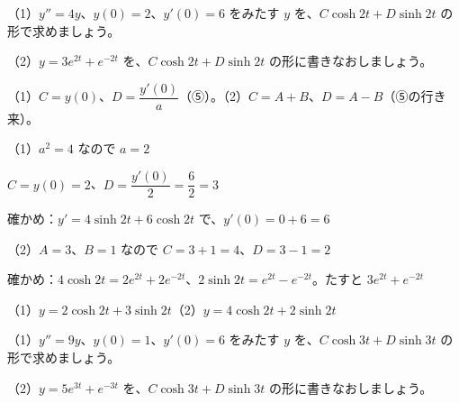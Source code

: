 \begin{reidai}[$y''=a^2y$ を $\cosh$・$\sinh$ で解く]
（1）$y''=4y$、$y(0)=2$、$y'(0)=6$ をみたす $y$ を、$C\cosh2t+D\sinh2t$ の形で求めましょう。\par
（2）$y=3e^{2t}+e^{-2t}$ を、$C\cosh2t+D\sinh2t$ の形に書きなおしましょう。\par
\kangaekata（1）$C=y(0)$、$D=\dfrac{y'(0)}{a}$（⑤）。（2）$C=A+B$、$D=A-B$（⑤の行き来）。\par
\shiki{}\zw{} （1）$a^2=4$ なので $a=2$\par
\bkvilb $C=y(0)=2$、$D=\dfrac{y'(0)}{2}=\dfrac{6}{2}=3$\par
\bkvilb 確かめ：$y'=4\sinh2t+6\cosh2t$ で、$y'(0)=0+6=6$\par
\bkvilq （2）$A=3$、$B=1$ なので $C=3+1=4$、$D=3-1=2$\par
\bkvilb 確かめ：$4\cosh2t=2e^{2t}+2e^{-2t}$、$2\sinh2t=e^{2t}-e^{-2t}$。たすと $3e^{2t}+e^{-2t}$\par
\kotae{}\zw{} （1）$y=2\cosh2t+3\sinh2t$\quad（2）$y=4\cosh2t+2\sinh2t$
\end{reidai}

\begin{jibun}
（1）$y''=9y$、$y(0)=1$、$y'(0)=6$ をみたす $y$ を、$C\cosh3t+D\sinh3t$ の形で求めましょう。\par
（2）$y=5e^{3t}+e^{-3t}$ を、$C\cosh3t+D\sinh3t$ の形に書きなおしましょう。
\end{jibun}

